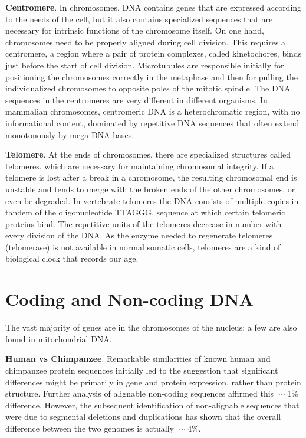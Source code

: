 \textbf{Centromere}. In chromosomes, DNA contains genes that are expressed according to the needs of the cell, but it also contains 
specialized sequences that are necessary for intrinsic functions of the chromosome itself. On one hand, chromosomes need 
to be properly aligned during cell division. This requires a centromere, a region where a pair of protein complexes, called 
kinetochores, binds just before the start of cell division. Microtubules are responsible initially for positioning the 
chromosomes correctly in the metaphase and then for pulling the individualized chromosomes to opposite poles of the mitotic 
spindle. The DNA sequences in the centromeres are very different in different organisms. In mammalian chromosomes, centromeric 
DNA is a heterochromatic region, with no informational content, dominated by repetitive DNA sequences that often extend 
monotonously by mega DNA bases. 

\textbf{Telomere}. At the ends of chromosomes, there are specialized structures called telomeres, which are necessary for maintaining 
chromosomal integrity. If a telomere is lost after a break in a chromosome, the resulting chromosomal end is unstable and 
tends to merge with the broken ends of the other chromosomes, or even be degraded. In vertebrate telomeres the DNA consists 
of multiple copies in tandem of the oligonucleotide TTAGGG, sequence at which certain telomeric proteins bind. The repetitive 
units of the telomeres decrease in number with every division of the DNA. As the enzyme needed to regenerate telomeres (telomerase) 
is not available in normal somatic cells, telomeres are a kind of biological clock that records our age.  

\section{Coding and Non-coding DNA}
The vast majority of genes are in the chromosomes of the nucleus; a few are also found in mitochondrial DNA. 

\textbf{Human vs Chimpanzee}. Remarkable similarities of known human and chimpanzee protein sequences initially led to the 
suggestion that significant differences might be primarily in gene and protein expression, rather than protein structure. 
Further analysis of alignable non-coding sequences affirmed this \(\backsim\)1\% difference. However, the subsequent identification 
of non-alignable sequences that were due to segmental deletions and duplications has shown that the overall difference between 
the two genomes is actually \(\backsim\)4\%.  

